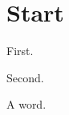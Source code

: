 \documentclass{article}
\begin{document}
\section{Start}
\begin{thm}
First.
\end{thm}
\begin{lem}
Second.
\end{lem}
\begin{defn}
A word.
\end{defn}
\end{document}
